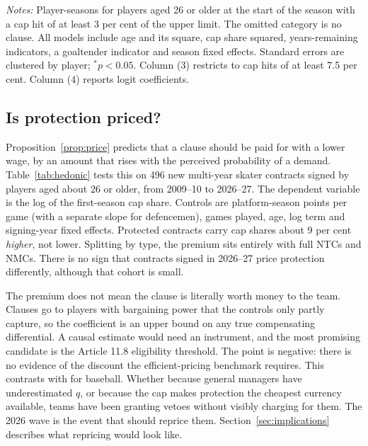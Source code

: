 \begin{table}[t]\centering\small
\caption{Probability of being traded in a season, by clause type (2013--14 to 2025--26)}\label{tab:hazard}

\begin{minipage}{0.95\linewidth}\footnotesize\vspace{4pt}
\emph{Notes:} Player-seasons for players aged 26 or older at the start of the season with a cap hit of at least 3 per cent of the upper limit. The omitted category is no clause. All models include age and its square, cap share squared, years-remaining indicators, a goaltender indicator and season fixed effects. Standard errors are clustered by player; $^{*}p<0.05$. Column (3) restricts to cap hits of at least 7.5 per cent. Column (4) reports logit coefficients.
\end{minipage}
\end{table}

\subsection{Is protection priced?}

Proposition~\ref{prop:price} predicts that a clause should be paid for with a lower wage, by an amount that rises with the perceived probability of a demand. Table~\ref{tab:hedonic} tests this on 496 new multi-year skater contracts signed by players aged about 26 or older, from 2009--10 to 2026--27. The dependent variable is the log of the first-season cap share. Controls are platform-season points per game (with a separate slope for defencemen), games played, age, log term and signing-year fixed effects. Protected contracts carry cap shares about 9 per cent \emph{higher}, not lower. Splitting by type, the premium sits entirely with full NTCs and NMCs. There is no sign that contracts signed in 2026--27 price protection differently, although that cohort is small.

The premium does not mean the clause is literally worth money to the team. Clauses go to players with bargaining power that the controls only partly capture, so the coefficient is an upper bound on any true compensating differential. A causal estimate would need an instrument, and the most promising candidate is the Article 11.8 eligibility threshold. The point is negative: there is no evidence of the discount the efficient-pricing benchmark requires. This contrasts with \citet{pedacehall2012} for baseball. Whether because general managers have underestimated $q$, or because the cap makes protection the cheapest currency available, teams have been granting vetoes without visibly charging for them. The 2026 wave is the event that should reprice them. Section~\ref{sec:implications} describes what repricing would look like.

